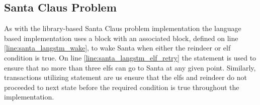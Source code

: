\subsection{Santa Claus Problem}
As with the library-based Santa Claus problem implementation the language based implementation uses a  block with an associated  block, defined on line \ref{line:santa_langstm_wake}, to wake Santa when either the reindeer or elf condition is true. On line \ref{line:santa_langstm_elf_retry} the  statement is used to ensure that no more than three elfs can go to Santa at any given point. Similarly, transactions utilizing  statement are us ensure that the elfs and reindeer do not proceeded to next state before the required condition is true throughout the implementation.

